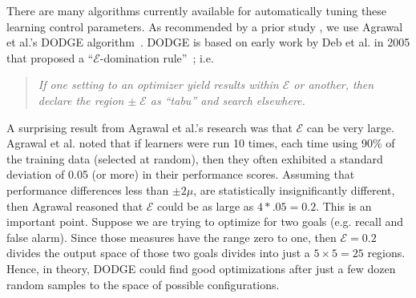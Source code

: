 There are many algorithms currently available for automatically
tuning these learning control parameters.  
As recommended by a prior study \cite{agrawal2021simpler}, we use Agrawal et al.'s  DODGE algorithm~\cite{agrawal2019dodge}. 
DODGE is based on early work by Deb et al. in 2005 that proposed
a ``$\mathcal{E}$-domination rule''~\cite{Deb05}; i.e. 
\begin{quote}
{\em 
If one setting to an optimizer yield results within $\mathcal{E}$
or another, then declare the region $\pm\;\mathcal{E}$ as ``tabu''
and search elsewhere.}
\end{quote}
A surprising result from  Agrawal et al.'s research was that
$\mathcal{E}$ can be very large. 
Agrawal et al. noted that if learners were run 10 times, each time using 90\% of the training data (selected at random), then they often exhibited a  standard deviation of 0.05 (or more) in their performance scores.  Assuming that performance differences less than ${\pm}2\mu$, are
statistically insignificantly different, then Agrawal reasoned that   
$\mathcal{E}$ could be as large as $4*.05=0.2$.
This is an important point.
Suppose we are trying to optimize
for two goals (e.g. recall and false alarm). Since those
measures have
the range zero to one, then
$\mathcal{E}=0.2$ divides the output space of those two goals divides into just a $5{\times}5=25$ regions. Hence, in theory,  DODGE could find good
optimizations after just a few dozen random samples to the space of possible configurations.


